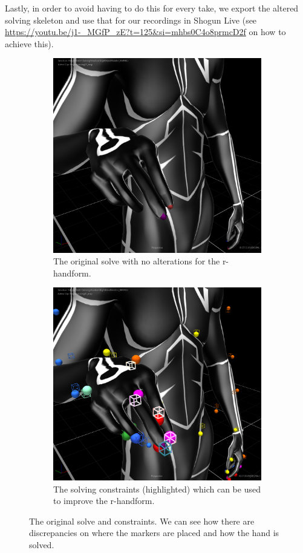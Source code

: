 \documentclass{uva-inf-article}
\begin{document}
Lastly, in order to avoid having to do this for every take, we export the altered solving skeleton and use that for our recordings in Shogun Live (see \url{https://youtu.be/j1-_MGfP_zE?t=125&si=mhbs0C4o8prmcD2f} on how to achieve this).

\begin{figure}[hbt!]
\begin{subfigure}{.5\textwidth}
  \centering
  \includegraphics[width=.8\linewidth]{imgs/r-handform/noR.png}
  \caption{The original solve with no alterations for the r-handform.}
  \label{fig:originalR:sfig1}
\end{subfigure}%
\begin{subfigure}{.5\textwidth}
  \centering
  \includegraphics[width=.8\linewidth]{imgs/r-handform/constraintsR.png}
  \caption{The solving constraints (highlighted) which can be used to improve the r-handform.}
  \label{fig:originalR:sfig2}
\end{subfigure}
\caption{The original solve and constraints. We can see how there are discrepancies on where the markers are placed and how the hand is solved.}
\label{fig:originalR}
\end{figure}
\end{document}
